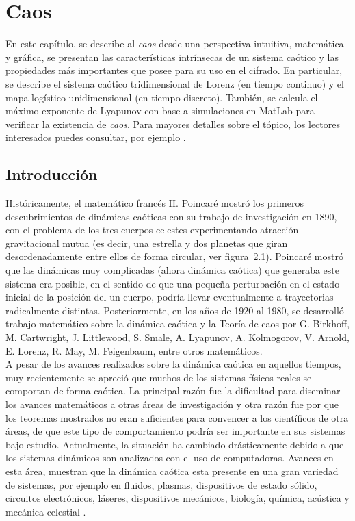 
\chapter{Caos}
En este capítulo, se describe al \textit{caos} desde una perspectiva intuitiva, matemática y gráfica, se presentan las características intrínsecas de un sistema caótico y las propiedades más importantes que posee para su uso en el cifrado. En particular, se describe el sistema caótico tridimensional de Lorenz (en tiempo continuo) y el mapa logístico unidimensional (en tiempo discreto). También, se calcula el máximo exponente de Lyapunov con base a simulaciones en MatLab para verificar la existencia de \textit{caos}. Para mayores detalles sobre el tópico, los lectores interesados puedes consultar, por ejemplo \cite{O_1993, H_2005}.

\section{Introducción}
Históricamente, el matemático francés H. Poincaré mostró los primeros descubrimientos de dinámicas caóticas con su trabajo de investigación en 1890, con el problema de los tres cuerpos celestes experimentando atracción gravitacional mutua (es decir, una estrella y dos planetas que giran desordenadamente entre ellos de forma circular, ver figura~2.1). Poincaré mostró que las dinámicas muy complicadas (ahora dinámica caótica) que generaba este sistema era posible, en el sentido de que una pequeña perturbación en el estado inicial de la posición del un cuerpo, podría llevar eventualmente a trayectorias radicalmente distintas. Posteriormente, en los años de 1920 al 1980, se desarrolló trabajo matemático sobre la dinámica caótica y la Teoría de caos por G. Birkhoff, M. Cartwright, J. Littlewood, S. Smale, A. Lyapunov, A. Kolmogorov, V. Arnold, E. Lorenz, R. May, M. Feigenbaum, entre otros matemáticos.  \\

A pesar de los avances realizados sobre la dinámica caótica en aquellos tiempos, muy recientemente se apreció que muchos de los sistemas físicos reales se comportan de forma caótica. La principal razón fue la dificultad para diseminar los avances matemáticos a otras áreas de investigación y otra razón fue por que los teoremas mostrados no eran suficientes para convencer a los científicos de otra áreas, de que este tipo de comportamiento podría ser importante en sus sistemas bajo estudio. Actualmente, la situación ha cambiado drásticamente debido a que los sistemas dinámicos son analizados con el uso de computadoras. Avances en esta área, muestran que la dinámica caótica esta presente en una gran variedad de sistemas, por ejemplo en fluidos, plasmas, dispositivos de estado sólido, circuitos electrónicos, láseres, dispositivos mecánicos, biología, química, acústica y mecánica celestial \cite{O_1993}. \\

